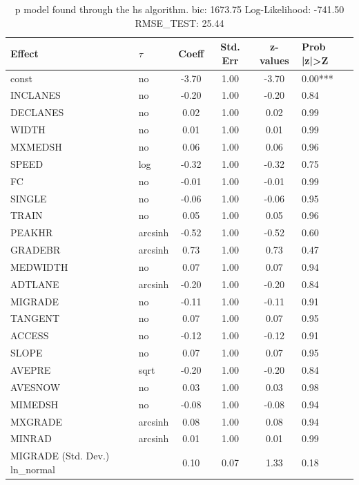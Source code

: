 \begin{table}
	\caption{p model found through the hs algorithm. bic: 1673.75 Log-Likelihood: -741.50 RMSE_TEST: 25.44}
	\begin{center}
		\begin{tabular}{|l|l|c|c|c|l|}
			\hline
			Effect & $\tau$ & Coeff & Std. Err & z-values & Prob |z|>Z \\
			\hline
			const & no & -3.70 & 1.00 & -3.70 & 0.00*** \\
			\hline
			INCLANES & no & -0.20 & 1.00 & -0.20 & 0.84 \\
			\hline
			DECLANES & no & 0.02 & 1.00 & 0.02 & 0.99 \\
			\hline
			WIDTH & no & 0.01 & 1.00 & 0.01 & 0.99 \\
			\hline
			MXMEDSH & no & 0.06 & 1.00 & 0.06 & 0.96 \\
			\hline
			SPEED & log & -0.32 & 1.00 & -0.32 & 0.75 \\
			\hline
			FC & no & -0.01 & 1.00 & -0.01 & 0.99 \\
			\hline
			SINGLE & no & -0.06 & 1.00 & -0.06 & 0.95 \\
			\hline
			TRAIN & no & 0.05 & 1.00 & 0.05 & 0.96 \\
			\hline
			PEAKHR & arcsinh & -0.52 & 1.00 & -0.52 & 0.60 \\
			\hline
			GRADEBR & arcsinh & 0.73 & 1.00 & 0.73 & 0.47 \\
			\hline
			MEDWIDTH & no & 0.07 & 1.00 & 0.07 & 0.94 \\
			\hline
			ADTLANE & arcsinh & -0.20 & 1.00 & -0.20 & 0.84 \\
			\hline
			MIGRADE & no & -0.11 & 1.00 & -0.11 & 0.91 \\
			\hline
			TANGENT & no & 0.07 & 1.00 & 0.07 & 0.95 \\
			\hline
			ACCESS & no & -0.12 & 1.00 & -0.12 & 0.91 \\
			\hline
			SLOPE & no & 0.07 & 1.00 & 0.07 & 0.95 \\
			\hline
			AVEPRE & sqrt & -0.20 & 1.00 & -0.20 & 0.84 \\
			\hline
			AVESNOW & no & 0.03 & 1.00 & 0.03 & 0.98 \\
			\hline
			MIMEDSH & no & -0.08 & 1.00 & -0.08 & 0.94 \\
			\hline
			MXGRADE & arcsinh & 0.08 & 1.00 & 0.08 & 0.94 \\
			\hline
			MINRAD & arcsinh & 0.01 & 1.00 & 0.01 & 0.99 \\
			\hline
			MIGRADE (Std. Dev.) ln_normal &  & 0.10 & 0.07 & 1.33 & 0.18 \\

\end{tabular}
\end{center}
\end{table}
